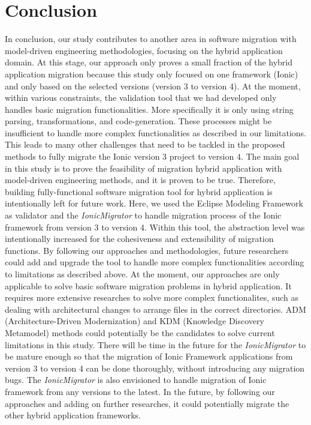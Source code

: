 \documentclass[conference]{IEEEtran}
\begin{document}
\section{Conclusion}
In conclusion, our study contributes to another area in software migration with
model-driven engineering methodologies, focusing on the hybrid application domain.
At this stage, our approach only proves a small fraction of the hybrid application migration because
this study only focused on one framework (Ionic) and only based on the selected versions (version 3 to version 4).
\newline \newline
At the moment, within various constraints, the validation tool that we had developed only handles basic migration functionalities.
More specifically it is only using string parsing, transformations, and code-generation. These processes might
be insufficient to handle more complex functionalities as described in our limitations.
\newline \newline
This leads to many other challenges that need to be tackled in the proposed methods to fully migrate the Ionic version 3 project
to version 4. The main goal in this study is to prove the feasibility of migration hybrid application with model-driven engineering
methods, and it is proven to be true. Therefore, building fully-functional software migration tool for hybrid application is intentionally
left for future work.
\newline \newline
Here, we used the Eclipse Modeling Framework as validator and the \textit{IonicMigrator} to handle migration process of
the Ionic framework from version 3 to version 4. Within this tool, the abstraction level was intentionally
increased for the cohesiveness and extensibility of migration functions. By following our approaches and methodologies,
future researchers could add and upgrade the tool to handle more complex functionalities according
to limitations as described above.
\newline \newline
At the moment, our approaches are only applicable to solve basic software migration problems in hybrid application.
It requires more extensive researches to solve more complex functionalites, such as dealing with
architectural changes to arrange files in the correct directories. ADM (Architecture-Driven Modernization) and
KDM (Knowledge Discovery Metamodel) methods \cite{b6} \cite{b10} could potentially be the candidates to solve
current limitations in this study.
\newline \newline
There will be time in the future for the \textit{IonicMigrator} to be mature enough so that the migration of Ionic Framework applications
from version  3 to version 4 can be done thoroughly, without introducing any migration bugs.
The \textit{IonicMigrator} is also envisioned to handle migration of Ionic framework from
any versions to the latest. In the future, by following our approaches and adding on further researches,
it could potentially migrate the other hybrid application frameworks.
\end{document}
